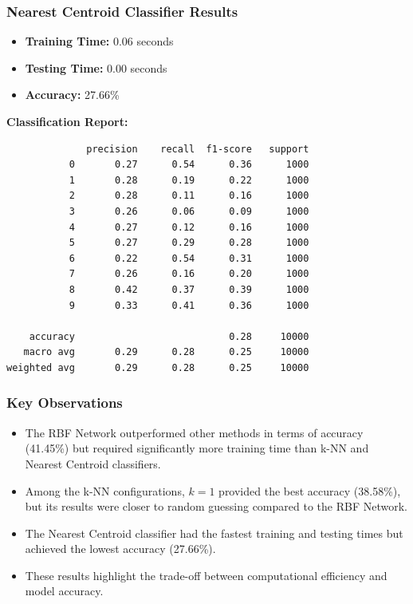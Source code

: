 \documentclass[lettersize,journal]{IEEEtran}
\begin{document}
\subsubsection{\textbf{Nearest Centroid Classifier Results}}
\begin{itemize}
    \item \textbf{Training Time:} 0.06 seconds
    \item \textbf{Testing Time:} 0.00 seconds
    \item \textbf{Accuracy:} 27.66\%
\end{itemize}

\textbf{Classification Report:}
\begin{scriptsize}
\begin{verbatim}
              precision    recall  f1-score   support
           0       0.27      0.54      0.36      1000
           1       0.28      0.19      0.22      1000
           2       0.28      0.11      0.16      1000
           3       0.26      0.06      0.09      1000
           4       0.27      0.12      0.16      1000
           5       0.27      0.29      0.28      1000
           6       0.22      0.54      0.31      1000
           7       0.26      0.16      0.20      1000
           8       0.42      0.37      0.39      1000
           9       0.33      0.41      0.36      1000

    accuracy                           0.28     10000
   macro avg       0.29      0.28      0.25     10000
weighted avg       0.29      0.28      0.25     10000
\end{verbatim}
\end{scriptsize}

\subsubsection{\textbf{Key Observations}}
\begin{itemize}
    \item The RBF Network outperformed other methods in terms of accuracy (41.45\%) but required significantly more training time than k-NN and Nearest Centroid classifiers.
    \item Among the k-NN configurations, $k=1$ provided the best accuracy (38.58\%), but its results were closer to random guessing compared to the RBF Network.
    \item The Nearest Centroid classifier had the fastest training and testing times but achieved the lowest accuracy (27.66\%).
    \item These results highlight the trade-off between computational efficiency and model accuracy.
\end{itemize}
\end{document}
